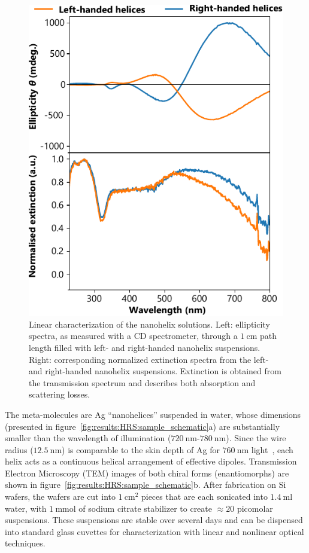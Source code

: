 \begin{figure}[htb!]	
    \centering	
    \includegraphics[scale=1]{./figures/results/HRS/linear_data.pdf}
    \caption{\label{fig:results:HRS:linear_data}
    Linear characterization of the nanohelix solutions. Left: ellipticity spectra, as measured with a CD spectrometer, through a $\SI{1}{\centi\m}$ path length filled with left- and right-handed nanohelix suspensions. Right: corresponding normalized extinction spectra from the left- and right-handed nanohelix suspensions. Extinction is obtained from the transmission spectrum and describes both absorption and scattering losses.}	
\end{figure}

The meta-molecules are Ag ``nanohelices'' suspended in water, whose dimensions (presented in figure~\ref{fig:results:HRS:sample_schematic}a) are substantially smaller than the wavelength of illumination ($\SI{720}{\nano\m}$-$\SI{780}{\nano\m}$). Since the wire radius ($\SI{12.5}{\nano\m}$) is comparable to the skin depth of Ag for $\SI{760}{\nano\m}$ light~\cite{Johnson1972}, each helix acts as a continuous helical arrangement of effective dipoles. Transmission Electron Microscopy (TEM) images of both chiral forms (enantiomorphs) are shown in figure~\ref{fig:results:HRS:sample_schematic}b. 
After fabrication on Si wafers, the wafers are cut into $\SI{1}{\centi\meter\squared}$ pieces that are each sonicated into $\SI{1.4}{\milli\litre}$ water, with $\SI{1}{\milli\mole}$ of sodium citrate stabilizer to create $\approx 20$ picomolar suspensions. These suspensions are stable over several days and can be dispensed into standard glass cuvettes for characterization with linear and nonlinear optical techniques.  


